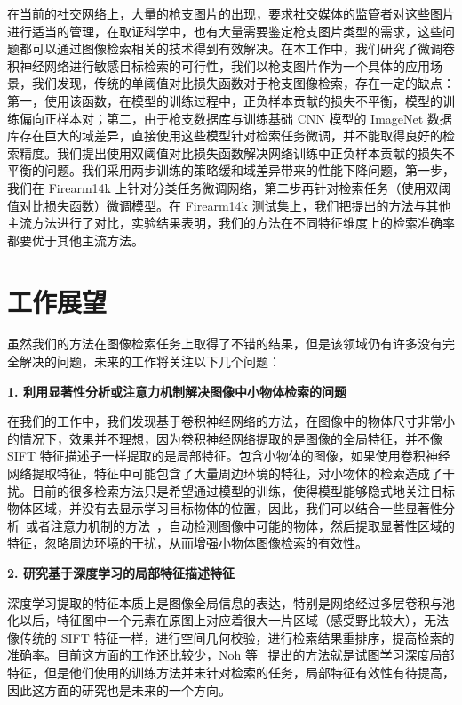 在当前的社交网络上，大量的枪支图片的出现，要求社交媒体的监管者对这些图片进行适当的管理，在取证科学中，也有大量需要鉴定枪支图片类型的需求，这些问题都可以通过图像检索相关的技术得到有效解决。在本工作中，我们研究了微调卷积神经网络进行敏感目标检索的可行性，我们以枪支图片作为一个具体的应用场景，我们发现，传统的单阈值对比损失函数对于枪支图像检索，存在一定的缺点：第一，使用该函数，在模型的训练过程中，正负样本贡献的损失不平衡，模型的训练偏向正样本对；第二，由于枪支数据库与训练基础 CNN 模型的 ImageNet 数据库存在巨大的域差异，直接使用这些模型针对检索任务微调，并不能取得良好的检索精度。我们提出使用双阈值对比损失函数解决网络训练中正负样本贡献的损失不平衡的问题。我们采用两步训练的策略缓和域差异带来的性能下降问题，第一步，我们在 Firearm14k 上针对分类任务微调网络，第二步再针对检索任务（使用双阈值对比损失函数）微调模型。在 Firearm14k 测试集上，我们把提出的方法与其他主流方法进行了对比，实验结果表明，我们的方法在不同特征维度上的检索准确率都要优于其他主流方法。

\section{工作展望}
虽然我们的方法在图像检索任务上取得了不错的结果，但是该领域仍有许多没有完全解决的问题，未来的工作将关注以下几个问题：

\textbf{1. 利用显著性分析或注意力机制解决图像中小物体检索的问题}

在我们的工作中，我们发现基于卷积神经网络的方法，在图像中的物体尺寸非常小的情况下，效果并不理想，因为卷积神经网络提取的是图像的全局特征，并不像 SIFT 特征描述子一样提取的是局部特征。包含小物体的图像，如果使用卷积神经网络提取特征，特征中可能包含了大量周边环境的特征，对小物体的检索造成了干扰。目前的很多检索方法只是希望通过模型的训练，使得模型能够隐式地关注目标物体区域，并没有去显示学习目标物体的位置，因此，我们可以结合一些显著性分析~\cite{Zhao2015SaliencyDB,Li2016DeepCL,Wang2015DeepNF}或者注意力机制的方法~\cite{Song2017DeepSA,Xiao2015TheAO,Zheng2017LearningMC}，自动检测图像中可能的物体，然后提取显著性区域的特征，忽略周边环境的干扰，从而增强小物体图像检索的有效性。

\textbf{2. 研究基于深度学习的局部特征描述特征}

深度学习提取的特征本质上是图像全局信息的表达，特别是网络经过多层卷积与池化以后，特征图中一个元素在原图上对应着很大一片区域（感受野比较大），无法像传统的 SIFT 特征一样，进行空间几何校验，进行检索结果重排序，提高检索的准确率。目前这方面的工作还比较少，Noh 等~\cite{Noh2017LargeScaleIR} 提出的方法就是试图学习深度局部特征，但是他们使用的训练方法并未针对检索的任务，局部特征有效性有待提高，因此这方面的研究也是未来的一个方向。

